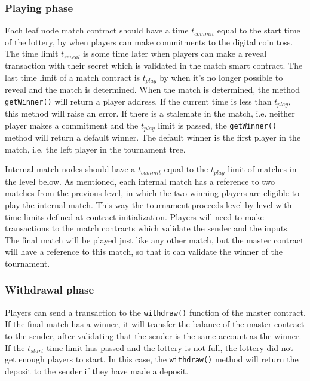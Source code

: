 \subsubsection{Playing phase}
Each leaf node match contract should have a time $t_{commit}$ equal to the start time of the lottery, by when players can make commitments to the digital coin toss. The time limit $t_{reveal}$ is some time later when players can make a reveal transaction with their secret which is validated in the match smart contract. The last time limit of a match contract is $t_{play}$ by when it's no longer possible to reveal and the match is determined. When the match is determined, the method \texttt{getWinner()} will return a player address. If the current time is less than $t_{play}$, this method will raise an error. If there is a stalemate in the match, i.e. neither player makes a commitment and the $t_{play}$ limit is passed, the \texttt{getWinner()} method will return a default winner. The default winner is the first player in the match, i.e. the left player in the tournament tree. 

Internal match nodes should have a $t_{commit}$ equal to the $t_{play}$ limit of matches in the level below. As mentioned, each internal match has a reference to two matches from the previous level, in which the two winning players are eligible to play the internal match. This way the tournament proceeds level by level with time limits defined at contract initialization. Players will need to make transactions to the match contracts which validate the sender and the inputs. The final match will be played just like any other match, but the master contract will have a reference to this match, so that it can validate the winner of the tournament.

\subsubsection{Withdrawal phase}
Players can send a transaction to the \texttt{withdraw()} function of the master contract. If the final match has a winner, it will transfer the balance of the master contract to the sender, after validating that the sender is the same account as the winner. If the $t_{start}$ time limit has passed and the lottery is not full, the lottery did not get enough players to start. In this case, the \texttt{withdraw()} method will return the deposit to the sender if they have made a deposit.
